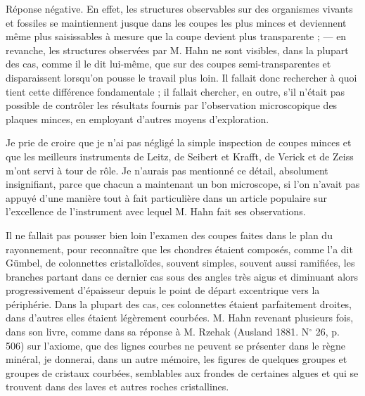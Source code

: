 \documentclass[a4paper, 12pt, oneside, french]{article}
\begin{document}
Réponse négative. En effet, les structures observables sur des organismes vivants et fossiles se maintiennent jusque dans les coupes les plus minces et deviennent même plus saisissables à mesure que la coupe devient plus transparente ; --- en revanche, les structures observées par M. Hahn ne sont visibles, dans la plupart des cas, comme il le dit lui-même, que sur des coupes semi-transparentes et disparaissent lorsqu'on pousse le travail plus loin. Il fallait donc rechercher à quoi tient cette différence fondamentale ; il fallait chercher, en outre, s'il n'était pas possible de contrôler les résultats fournis par l'observation microscopique des plaques minces, en employant d'autres moyens d'exploration.

Je prie de croire que je n'ai pas négligé la simple inspection de coupes minces et que les meilleurs instruments de Leitz, de Seibert et Krafft, de Verick et de Zeiss m'ont servi à tour de rôle. Je n'aurais pas mentionné ce détail, absolument insignifiant, parce que chacun a maintenant un bon microscope, si l'on n'avait pas appuyé d'une manière tout à fait particulière dans un article populaire sur l'excellence de l'instrument avec lequel M. Hahn fait ses observations.

Il ne fallait pas pousser bien loin l'examen des coupes faites dans le plan du rayonnement, pour reconnaître que les chondres étaient composés, comme l'a dit Gümbel, de colonnettes cristalloïdes, souvent simples, souvent aussi ramifiées, les branches partant dans ce dernier cas sous des angles très aigus et diminuant alors progressivement d'épaisseur depuis le point de départ excentrique vers la périphérie. Dans la plupart des cas, ces colonnettes étaient parfaitement droites, dans d'autres elles étaient légèrement courbées. M. Hahn revenant plusieurs fois, dans son livre, comme dans sa réponse à M. Rzehak (Ausland 1881. N$^{\circ}$ 26, p. 506) sur l'axiome, que des lignes courbes ne peuvent se présenter dans le règne minéral, je donnerai, dans un autre mémoire, les figures de quelques groupes et groupes de cristaux courbées, semblables aux frondes de certaines algues et qui se trouvent dans des laves et autres roches cristallines.
\end{document}
